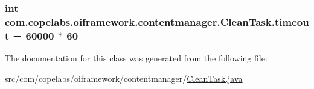 \subsubsection[{timeout}]{\setlength{\rightskip}{0pt plus 5cm}int com.\+copelabs.\+oiframework.\+contentmanager.\+Clean\+Task.\+timeout = 60000 $\ast$ 60\hspace{0.3cm}{\ttfamily [private]}}\label{classcom_1_1copelabs_1_1oiframework_1_1contentmanager_1_1_clean_task_a3335ef76525dc81214c4e4f154f67c65}


The documentation for this class was generated from the following file\+:\begin{DoxyCompactItemize}
\item 
src/com/copelabs/oiframework/contentmanager/\hyperlink{_clean_task_8java}{Clean\+Task.\+java}\end{DoxyCompactItemize}
